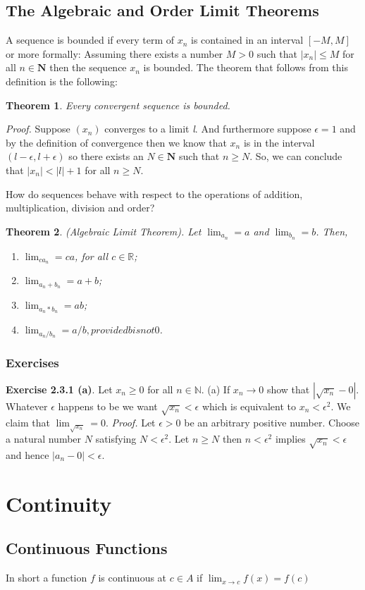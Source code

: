 \documentclass[10pt]{amsbook}
\newtheorem{theorem}{Theorem}
\begin{document}
\section{The Algebraic and Order Limit Theorems}
A sequence is bounded if every term of $x_{n}$ is contained in an interval $\left[-M, M\right]$ or more formally: Assuming there exists a number $M > 0$ such that $\left|x_{n}\right| \le M$ for all $n \in \mathbf{N}$ then the sequence $x_{n}$ is bounded. The theorem that follows from this definition is the following: 
\begin{theorem}
\textit{Every convergent sequence is bounded.}
\end{theorem}
\textit{Proof.} Suppose $\left(x_{n}\right)$ converges to a limit \textit{l}. And furthermore suppose $\epsilon = 1$ and by the definition of convergence then we know that $x_{n}$ is in the interval 
$\left(l-\epsilon, l+\epsilon\right)$ so there exists an $N \in \mathbf{N}$ such that $n \ge N$. So, we can conclude that $\left|x_{n}\right| < \left|l\right| + 1$ for all $n \ge N$.

How do sequences behave with respect to the operations of addition, multiplication, division and order?

\begin{theorem}
    (Algebraic Limit Theorem).
    Let $\lim_{a_{n}} = a$ and $\lim_{b_{n}} = b$. Then,
    \begin{enumerate}[label=(\roman*)]
    \item $\lim_{ca_{n}} = ca$, for all $c \in \mathbb{R}$;
    \item $\lim_{a_{n} + b_{n}} = a + b$;
    \item $\lim_{a_{n} * b_{n}} = ab$;
    \item $\lim_{a_{n}/b_{n}} = a/b, provided b is not 0$.
    \end{enumerate}
\end{theorem}
\subsection{Exercises}
\textbf{Exercise 2.3.1 (a)}. 
Let $x_{n} \ge 0$ for all $n \in \mathbb{N}$. (a) If $x_{n} \to 0$
show that $\left|\sqrt{x_{n}} - 0\right|$. Whatever $\epsilon$ happens to be we want $\sqrt{x_{n}} < \epsilon$ which is equivalent to $x_{n} < \epsilon^2$. We claim that $\lim_{\sqrt{x_{n}}} = 0$. \textit{Proof.} Let $\epsilon > 0$ be an arbitrary positive number. Choose a natural number  $N$ satisfying  $N < \epsilon^2$. Let $n \ge N$ then $n < \epsilon^2$ implies $\sqrt{x_{n}} < \epsilon$ and hence $\left|a_{n} - 0\right| < \epsilon$.
\chapter{Continuity}
\section{Continuous Functions}
In short  a function $f$ is continuous at $c \in A$ if $\lim_{x\to c} f\left(x\right) = f\left(c\right)$
\end{document}
